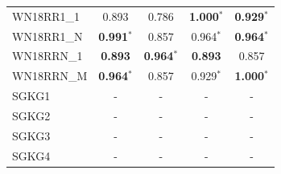 \begin{table}[t]
{\begin{tabular}{l||cc||cc}
WN18RR1\_1 & 0.893 & 0.786 & \textbf{1.000}$^*$ & \textbf{0.929}$^*$ \\
WN18RR1\_N & \textbf{0.991}$^*$ & 0.857 & 0.964$^*$ & \textbf{0.964}$^*$ \\
WN18RRN\_1 & \textbf{0.893} & \textbf{0.964}$^*$ & \textbf{0.893} & 0.857 \\
WN18RRN\_M & \textbf{0.964}$^*$ & 0.857 & 0.929$^*$ & \textbf{1.000}$^*$ \\
\hline
SGKG1 & - & - & - & - \\
SGKG2 & - & - & - & - \\
SGKG3 & - & - & - & - \\
SGKG4 & - & - & - & - \\
\hline
\end{tabular}%
}
\end{table}
